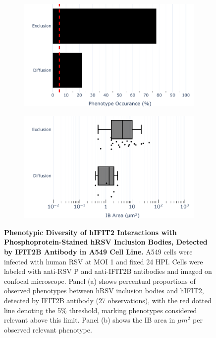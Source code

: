 \begin{figure}
    \begin{subfigure}{0.495\textwidth}
        \caption{}
        \includegraphics[width=1\linewidth]{08. Chapter 3/Figs/02. Infection/02. IFIT2/02. IFIT2B/04. bar_i2b_a549-p.pdf} 
    \end{subfigure}
    \begin{subfigure}{0.495\textwidth}
        \caption{}
        \includegraphics[width=1\linewidth]{08. Chapter 3/Figs/02. Infection/02. IFIT2/02. IFIT2B/05. box_i2b_a549-p.pdf}
    \end{subfigure}
    \caption[Phenotypic Diversity of hIFIT2 Interactions with Phosphoprotein-Stained hRSV Inclusion Bodies, Detected by IFIT2B Antibody in A549 Cell Line.]{\textbf{Phenotypic Diversity of hIFIT2 Interactions with Phosphoprotein-Stained hRSV Inclusion Bodies, Detected by IFIT2B Antibody in A549 Cell Line.} A549 cells were infected with human RSV at MOI 1 and fixed 24 HPI. Cells were labeled with anti-RSV P and anti-IFIT2B antibodies and imaged on confocal microscope. Panel (a) shows percentual proportions of observed phenotypes between hRSV inclusion bodies and hIFIT2, detected by IFIT2B antibody (27 observations), with the red dotted line denoting the 5\% threshold, marking phenotypes considered relevant above this limit. Panel (b) shows the IB area in \(\mu m^2\) per observed relevant phenotype.}
    \label{fig:Phenotypic Diversity of hIFIT2 Interactions with Phosphoprotein-Stained hRSV Inclusion Bodies, Detected by IFIT2B Antibody in A549 Cell Line}
\end{figure}

